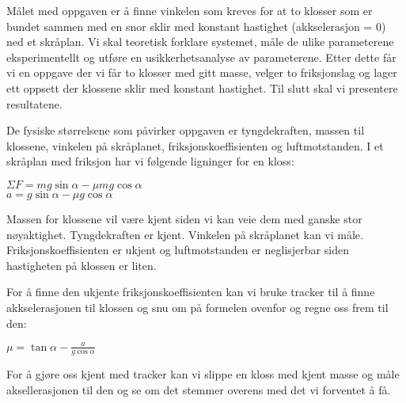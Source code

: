 \documentclass[a4paper]{article}
\date{}
\begin{document}
\thispagestyle{fancy}

Målet med oppgaven er å finne vinkelen som kreves for at to klosser som er bundet sammen med en snor sklir med konstant hastighet (akkselerasjon = 0) ned et skråplan. Vi skal teoretisk forklare systemet, måle de ulike parameterene eksperimentellt og utføre en usikkerhetsanalyse av parameterene. Etter dette får vi en oppgave der vi får to klosser med gitt masse, velger to friksjonslag og lager ett oppsett der klossene sklir med konstant hastighet. Til slutt skal vi presentere resultatene.

De fysiske størrelsene som påvirker oppgaven er tyngdekraften, massen til klossene, vinkelen på skråplanet, friksjonskoeffisienten og luftmotstanden. I et skråplan med friksjon har vi følgende ligninger for en kloss:
\par
$\Sigma F = mg\sin\alpha - \mu mg\cos\alpha$\\
$a = g\sin\alpha - \mu g\cos\alpha$

Massen for klossene vil være kjent siden vi kan veie dem med ganske stor nøyaktighet. Tyngdekraften er kjent. Vinkelen på skråplanet kan vi måle. Friksjonskoeffisienten er ukjent og luftmotstanden er neglisjerbar siden hastigheten på klossen er liten.

For å finne den ukjente friksjonskoeffisienten kan vi bruke tracker til å finne akkselerasjonen til klossen og snu om på formelen ovenfor og regne oss frem til den:
\par
$\mu = \tan\alpha -\frac{a}{g\cos\alpha}$

For å gjøre oss kjent med tracker kan vi slippe en kloss med kjent masse og måle aksellerasjonen til den og se om det stemmer overens med det vi forventet å få.
\end{document}
